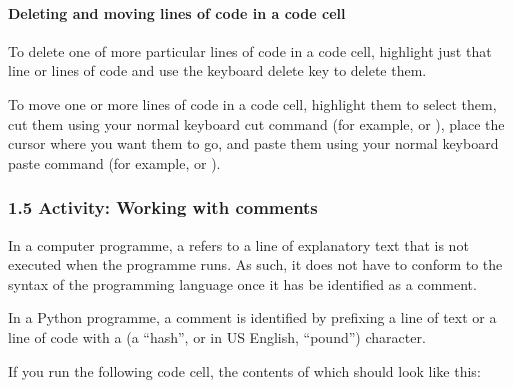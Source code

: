 \documentclass[letterpaper,10pt,english]{sphinxmanual}
\begin{document}
\paragraph{Deleting and moving lines of code in a code cell}
\label{\detokenize{content/01_Robot_Lab/Section_00_01:Deleting-and-moving-lines-of-code-in-a-code-cell}}
To delete one of more particular lines of code in a code cell, highlight just that line or lines of code and use the keyboard delete key to delete them.

To move one or more lines of code in a code cell, highlight them to select them, cut them using your normal keyboard cut command (for example,  or ), place the cursor where you want them to go, and paste them using your normal keyboard paste command (for example,  or ).


\subsubsection{1.5 Activity: Working with comments}
\label{\detokenize{content/01_Robot_Lab/Section_00_01:1.5-Activity:-Working-with-comments}}
In a computer programme, a  refers to a line of explanatory text that is not executed when the programme runs. As such, it does not have to conform to the syntax of the programming language once it has be identified as a comment.

In a Python programme, a comment is identified by prefixing a line of text or a line of code with a \sphinxcode{\sphinxupquote{\#}} (a “hash”, or in US English, “pound”) character.

\begin{sphinxVerbatim}[commandchars=\\\{\}]
\end{sphinxVerbatim}

If you run the following code cell, the contents of which should look like this:

\begin{sphinxVerbatim}[commandchars=\\\{\}]


\end{sphinxVerbatim}
\end{document}
